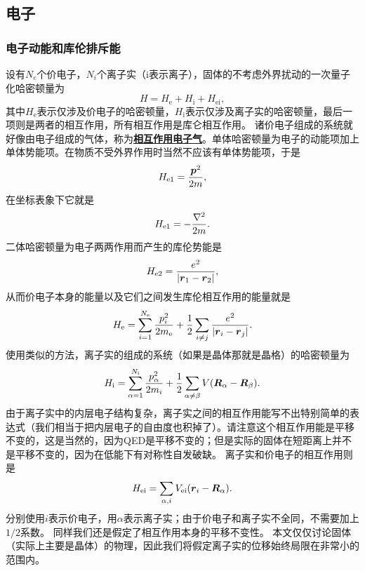 \documentclass[hyperref, UTF8, a4paper]{ctexart}
\newcommand*{\concept}[1]{\underline{\textbf{#1}}}
\begin{document}
\subsection{电子}

\subsubsection{电子动能和库伦排斥能}

设有$N_e$个价电子，$N_i$个离子实（i表示离子），固体的不考虑外界扰动的一次量子化哈密顿量为
\begin{equation}
    {H} = {H}_\text{e} + {H}_\text{i} + {H}_\text{ei},
    \label{eq:many-body-hamiltonian}
\end{equation}
其中${H}_\text{e}$表示仅涉及价电子的哈密顿量，${H}_\text{i}$表示仅涉及离子实的哈密顿量，最后一项则是两者的相互作用，所有相互作用是库仑相互作用。
诸价电子组成的系统就好像由电子组成的气体，称为\concept{相互作用电子气}。单体哈密顿量为电子的动能项加上单体势能项。在物质不受外界作用时当然不应该有单体势能项，于是
\[
    {H}_\text{e1} = \frac{{\vb*{p}}^2}{2m},
\]
在坐标表象下它就是
\[
    {H}_\text{e1} = - \frac{\laplacian}{2m}.
\]
二体哈密顿量为电子两两作用而产生的库伦势能是
\[
    {H}_\text{e2} = \frac{e^2}{\abs{\vb*{r}_1 - \vb*{r}_2}},
\]
从而价电子本身的能量以及它们之间发生库伦相互作用的能量就是
\begin{equation}
    {H}_\text{e} = \sum_{i=1}^{N_\text{e}} \frac{{p}_i^2}{2m_\text{e}} + \frac{1}{2} \sum_{i\neq j} \frac{e^2}{\abs{\vb*{r}_i - \vb*{r}_j}}.
\end{equation}
使用类似的方法，离子实的组成的系统（如果是晶体那就是晶格）的哈密顿量为
\begin{equation}
    {H}_\text{i} = \sum_{\alpha=1}^{N_\text{i}} \frac{{p}_\alpha^2}{2m_i} + \frac{1}{2} \sum_{\alpha\neq\beta} V(\vb*{R}_\alpha-\vb*{R}_\beta).
\end{equation}
由于离子实中的内层电子结构复杂，离子实之间的相互作用能写不出特别简单的表达式（我们相当于把内层电子的自由度也积掉了）。请注意这个相互作用能是平移不变的，这是当然的，因为QED是平移不变的；但是实际的固体在短距离上并不是平移不变的，因为在低能下有对称性自发破缺。
离子实和价电子的相互作用则是
\begin{equation}
    {H}_\text{ei} = \sum_{\alpha, i} V_\text{ei}(\vb*{r}_i-\vb*{R}_\alpha). 
\end{equation}
分别使用$i$表示价电子，用$\alpha$表示离子实；由于价电子和离子实不全同，不需要加上$1/2$系数。
同样我们还是假定了相互作用本身的平移不变性。
本文仅仅讨论固体（实际上主要是晶体）的物理，因此我们将假定离子实的位移始终局限在非常小的范围内。
\end{document}
